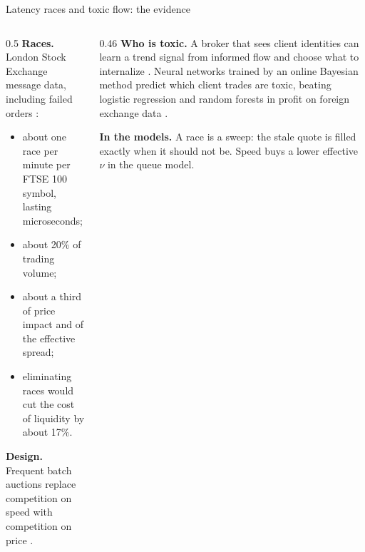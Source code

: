 \documentclass[aspectratio=169,10pt]{beamer}
\begin{document}
\begin{frame}{Latency races and toxic flow: the evidence}
  \small
  \begin{columns}[T]
    \begin{column}{0.5\textwidth}
      \textbf{Races.} London Stock Exchange message data, including failed orders \citep{aquilina2022quantifying}:
      \begin{itemize}
        \item about one race per minute per FTSE 100 symbol, lasting microseconds;
        \item about 20\% of trading volume;
        \item about a third of price impact and of the effective spread;
        \item eliminating races would cut the cost of liquidity by about 17\%.
      \end{itemize}
      \textbf{Design.} Frequent batch auctions replace competition on speed with competition on price \citep{budish2015high}.
    \end{column}
    \begin{column}{0.46\textwidth}
      \textbf{Who is toxic.} A broker that sees client identities can learn a trend signal from informed flow and choose what to internalize \citep{cartea2025brokers}. Neural networks trained by an online Bayesian method predict which client trades are toxic, beating logistic regression and random forests in profit on foreign exchange data \citep{cartea2023detecting}.

      \vspace{0.3em}
      \textbf{In the models.} A race is a sweep: the stale quote is filled exactly when it should not be. Speed buys a lower effective $\nu$ in the queue model.
    \end{column}
  \end{columns}
\end{frame}
\end{document}
